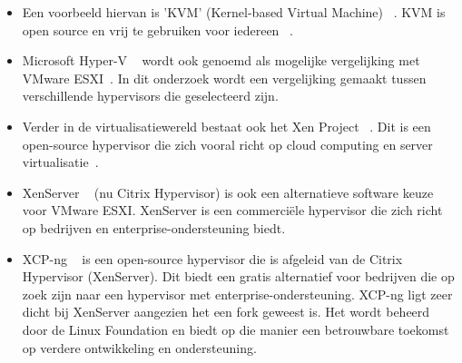 \begin{itemize}
    \item Een voorbeeld hiervan is 'KVM' (Kernel-based Virtual Machine) ~\autocite{KVM}. KVM is open source en vrij te gebruiken voor iedereen ~\autocite{KVM}.

    \item Microsoft Hyper-V ~\autocite{Eaton2019} wordt ook genoemd als mogelijke vergelijking met VMware ESXI~\autocite{fayyad2013benchmarking}. In dit onderzoek wordt een vergelijking gemaakt tussen verschillende hypervisors die geselecteerd zijn.

    \item Verder in de virtualisatiewereld bestaat ook het Xen Project ~\autocite{xenproject}. Dit is een open-source hypervisor die zich vooral richt op cloud computing en server virtualisatie~\autocite{binu2011virtualization}.

    \item XenServer ~\autocite{xenserverwebsite} (nu Citrix Hypervisor) is ook een alternatieve software keuze voor VMware ESXI. XenServer is een commerciële hypervisor die zich richt op bedrijven en enterprise-ondersteuning biedt.

    \item XCP-ng ~\autocite{el2021server} is een open-source hypervisor die is afgeleid van de Citrix Hypervisor (XenServer). Dit biedt een gratis alternatief voor bedrijven die op zoek zijn naar een hypervisor met enterprise-ondersteuning. XCP-ng ligt zeer dicht bij XenServer aangezien het een fork geweest is. Het wordt beheerd door de Linux Foundation en biedt op die manier een betrouwbare toekomst op verdere ontwikkeling en ondersteuning.
\end{itemize}


